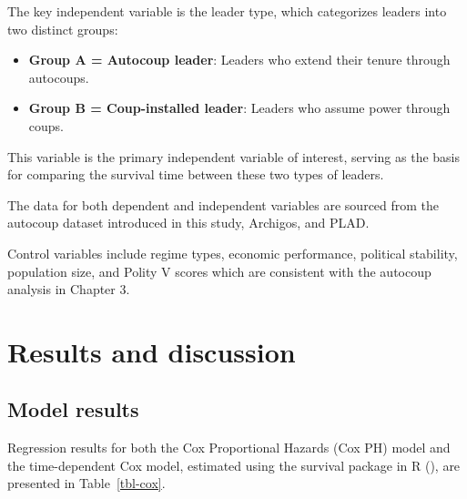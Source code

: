\documentclass[
  12pt,
]{report}
\providecommand{\tightlist}{%
  \setlength{\itemsep}{0pt}\setlength{\parskip}{0pt}}\usepackage{longtable,booktabs,array}
\begin{document}
The key independent variable is the leader type, which categorizes
leaders into two distinct groups:

\begin{itemize}
\tightlist
\item
  \textbf{Group A = Autocoup leader}: Leaders who extend their tenure
  through autocoups.
\item
  \textbf{Group B = Coup-installed leader}: Leaders who assume power
  through coups.
\end{itemize}

This variable is the primary independent variable of interest, serving
as the basis for comparing the survival time between these two types of
leaders.

The data for both dependent and independent variables are sourced from
the autocoup dataset introduced in this study, Archigos, and PLAD.

Control variables include regime types, economic performance, political
stability, population size, and Polity V scores which are consistent
with the autocoup analysis in Chapter 3.

\section{Results and discussion}\label{results-and-discussion}

\subsection{Model results}\label{model-results}

Regression results for both the Cox Proportional Hazards (Cox PH) model
and the time-dependent Cox model, estimated using the survival package
in R (), are presented in
Table~\ref{tbl-cox}.
\end{document}
